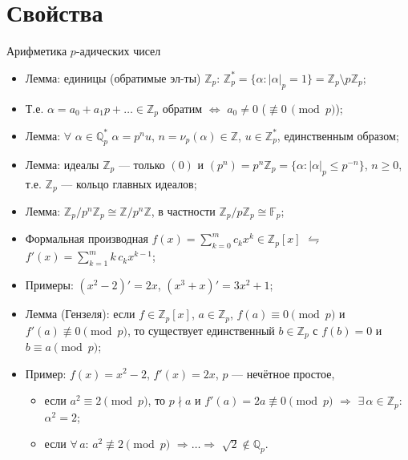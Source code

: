 \documentclass[serif, aspectratio=169]{beamer}
\begin{document}
\section{Свойства}

\begin{frame}{Арифметика $p$-адических чисел}
    \begin{itemize}
        \item Лемма: единицы (обратимые эл-ты) $\mathbb{Z}_p$: $\mathbb{Z}_p^*=\{\alpha:|\alpha|_p=1\}=\mathbb{Z}_p\setminus p\mathbb{Z}_p$;
        \item Т.е. $\alpha=a_0+a_1p+\dots\in \mathbb{Z}_p$ обратим $\Leftrightarrow$ $a_0\neq0$ ($\not\equiv 0\, \pmod{p}$); 
        \item Лемма: $\forall$ $\alpha\in\mathbb{Q}_p^*$ $\alpha=p^{n}u$, $n=\nu_p(\alpha)\in\mathbb{Z}$, $u\in\mathbb{Z}_p^*$, единственным образом;
        \item Лемма: идеалы $\mathbb{Z}_p$ --- только $(0)$ и $(p^n)=p^n\mathbb{Z}_p=\{\alpha:|\alpha|_p\leqslant p^{-n}\}$, $n\geqslant0$,\\ т.е. $\mathbb{Z}_p$ --- кольцо главных идеалов;
        \item Лемма: $\mathbb{Z}_p/p^n\mathbb{Z}_p\cong\mathbb{Z}/p^n\mathbb{Z}$, в частности $\mathbb{Z}_p/p\mathbb{Z}_p\cong\mathbb{F}_p$;
        \item Формальная производная $f(x)=\sum_{k=0}^{m}c_kx^k\in\mathbb{Z}_p[x]$ $\leftrightharpoons$ $f'(x)=\sum_{k=1}^{m}k\,c_kx^{k-1}$;
        \item Примеры: $(x^2-2)'=2x$, $(x^3+x)'=3x^2+1$;
        \item Лемма (Гензеля): если $f\in\mathbb{Z}_p[x]$, $a\in\mathbb{Z}_p$, $f(a)\equiv0\pmod p$ и $f'(a)\not\equiv0\pmod p$, то существует единственный $b\in\mathbb{Z}_p$ с $f(b)=0$ и $b\equiv a\pmod p$;
        \item Пример: $f(x)=x^2-2$, $f'(x)=2x$, $p$ --- нечётное простое,
        \begin{itemize}
            \item если $a^2\equiv2\pmod p$, то $p\nmid a$ и $f'(a)=2a\not\equiv0\pmod p$ $\Rightarrow$ $\exists\,\alpha\in\mathbb{Z}_p$: $\alpha^2=2$;
            \item если $\forall\, a$: $a^2\not\equiv2\pmod p$ $\Rightarrow\dots\Rightarrow$  $\sqrt2\not\in\mathbb{Q}_p$.
        \end{itemize}
    \end{itemize}
    
    \note{
        \begin{itemize}
            \item ---
        \end{itemize}
    }
\end{frame}
\end{document}

